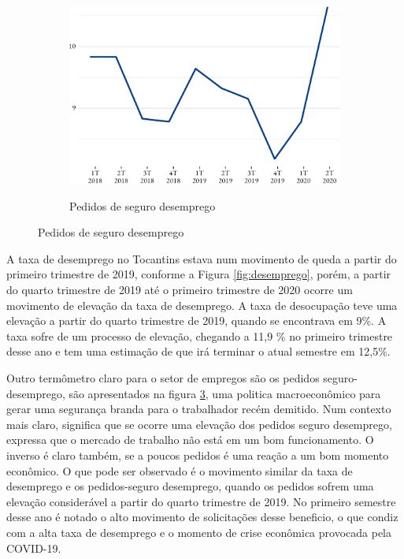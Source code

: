 \begin{figure}[!h]
\begin{subfigure}{\linewidth}
		\notes{\trimestres}
		\label{fig:ocupada}
	\end{subfigure}
	\begin{subfigure}{\linewidth}
		\caption{Pedidos de seguro desemprego}
		\includegraphics{fig/pedido_segudo_desem-1.pdf}
		\notes{\trimestres}
		\label{fig:seguro}
	\end{subfigure}
\end{figure}

\par A taxa de desemprego no Tocantins estava num movimento de queda a partir do primeiro trimestre de 2019, conforme a Figura \ref{fig:desemprego}, porém, a partir do quarto trimestre de 2019 até o primeiro trimestre de 2020 ocorre um movimento de elevação da taxa de desemprego. A taxa de desocupação teve uma elevação a partir do quarto trimestre de 2019, quando se encontrava em 9\%. A taxa sofre de um processo de elevação, chegando a 11,9 \% no primeiro trimestre desse ano e tem uma estimação de que irá terminar o atual semestre em 12,5\%.



\par Outro termômetro claro para o setor de empregos são os pedidos seguro-desemprego, são apresentados na figura \ref{fig:seguro}, uma politica macroeconômico para gerar uma segurança branda para o trabalhador recém demitido. Num contexto mais claro, significa que se ocorre uma elevação dos pedidos seguro desemprego, expressa que o mercado de trabalho não está em um bom funcionamento. O inverso é claro também, se a poucos pedidos é uma reação a um bom momento econômico. O que pode ser observado é o movimento similar da taxa de desemprego e os pedidos-seguro desemprego, quando os pedidos sofrem uma elevação considerável a partir do quarto trimestre de 2019. No primeiro semestre desse ano é notado o alto movimento de solicitações desse beneficio, o que condiz com a alta taxa de desemprego e o momento de crise econômica provocada pela COVID-19.

